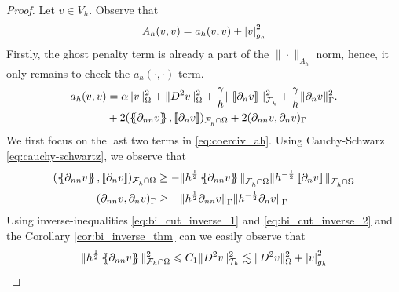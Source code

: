 \begin{proof}
    Let $v \in V_{h}$.
    Observe that
    \begin{equation}
    A_{h}( v,v) = a_{h}( v,v)  + \left\lvert  v  \right\rvert_{g_{h}}^{2}
    \end{equation}
    Firstly, the ghost penalty term is already a part of the $\| \cdot  \|_{ A_{h} }^{  } $ norm, hence, it only remains to check the $a_{h}( \cdot ,\cdot ) $ term.
    \begin{equation}
        \label{eq:coerciv_ah}
    \begin{split}
       a_{h}( v,v) &=   \alpha \| v \|_{   \Omega   }^{2} + \| D^2v \|_{   \Omega  }^{2  }  + \frac{\gamma }{h}  \|  \jump{ \partial _{n} v }\|_{\mathcal{F} _{h}^{}  }^{ 2 } + \frac{\gamma }{h}  \| \partial _{n} v \|_{ \Gamma  }^{ 2 }. \\
                   & + 2 ( \mean{ \partial _{nn} v }, \jump{ \partial _{n} v }    )_{\mathcal{F} ^{}_{h} \cap \Omega }  + 2 (  \partial _{nn} v ,
       \partial _{n} v  )_{\Gamma } \\
    \end{split}
    \end{equation}
    We first focus on the last two terms in \eqref{eq:coerciv_ah}. Using Cauchy-Schwarz \eqref{eq:cauchy-schwartz}, we observe that
    \begin{equation}
        \begin{split}
    ( \mean{ \partial _{nn} v }  , \jump{ \partial _{n} v }  )_{\mathcal{F}^{}_{h}\cap \Omega  } & \ge - \| h^{\frac{1}{2}}\mean{ \partial _{nn} v }   \|_{ \mathcal{F}^{}_{h}\cap \Omega   }^{  }  \|h^{-\frac{1}{2}} \jump{ \partial _{n} v }   \|_{
    \mathcal{F}^{}_{h}\cap \Omega   }^{  } \\
    (  \partial _{nn} v   ,  \partial _{n} v   )_{\Gamma   } & \ge - \| h^{\frac{1}{2}} \partial _{nn} v    \|_{ \Gamma    }^{  }  \|h^{-\frac{1}{2}}  \partial _{n} v    \|_{ \Gamma    }^{  }
        \end{split}
    \end{equation}
    Using inverse-inequalities \eqref{eq:bi_cut_inverse_1} and \eqref{eq:bi_cut_inverse_2} and the Corollary \ref{cor:bi_inverse_thm} can we easily observe that
    \begin{equation}
        \begin{split}
     \| h^{\frac{1}{2}} \mean{ \partial _{nn}v } \|_{ \mathcal{F}_{h} \cap \Omega    }^{  2} & \le C_{1} \| D^2 v \|_{ \mathcal{T}_{h}   }^{2  } \lesssim   \| D^2 v \|_{ \Omega  }^{ 2 }  + \abs{ v } _{ g_{h} }^{2  }   \\

\end{split}
\end{equation}
\end{proof}
